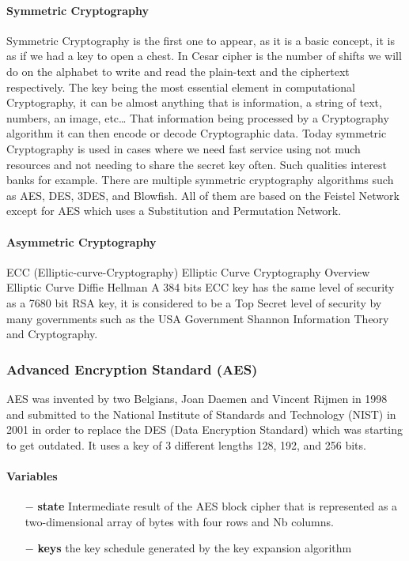 \paragraph{Symmetric Cryptography}
Symmetric Cryptography is the first one to appear, as it is a basic concept, it is as if we had a key to open a chest. In Cesar cipher is the number of shifts we will do on the alphabet to write and read the plain-text and the ciphertext respectively. The key being the most essential element in computational Cryptography, it can be almost anything that is information, a string of text, numbers, an image, etc… That information being processed by a Cryptography algorithm it can then encode or decode Cryptographic data. Today symmetric Cryptography is used in cases where we need fast service using not much resources and not needing to share the secret key often. Such qualities interest banks for example. There are multiple symmetric cryptography algorithms such as AES, DES, 3DES, and Blowfish. All of them are based on the Feistel Network except for AES which uses a Substitution and Permutation Network.

\paragraph{Asymmetric Cryptography}
ECC (Elliptic-curve-Cryptography) Elliptic Curve Cryptography Overview Elliptic Curve Diffie Hellman A 384 bits ECC key has the same level of security as a 7680 bit RSA key, it is considered to be a Top Secret level of security by many governments such as the USA Government Shannon Information Theory and Cryptography.

\subsubsection{Advanced Encryption Standard (AES)}
AES was invented by two Belgians, Joan Daemen and Vincent Rijmen in 1998 and submitted to the National Institute of Standards and Technology (NIST) in 2001 in order to replace the DES (Data Encryption Standard) which was starting to get outdated. It uses a key of 3 different lengths 128, 192, and 256 bits.
\cite{wiki_aes}


\paragraph{Variables}\cite{nist_aes}
\begin{itemize}
    \item [$-$] \textbf{state} Intermediate result of the AES block cipher that is represented as a two-dimensional array of bytes with four rows and Nb columns.
    \item [$-$] \textbf{keys} the key schedule generated by the key expansion algorithm
\end{itemize}
